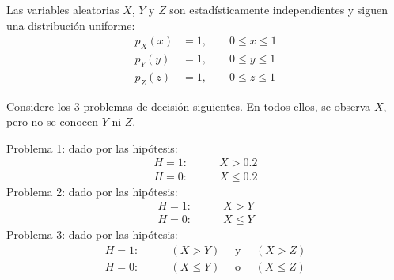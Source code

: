 \question 


\ifspanish


Las variables aleatorias $X$, $Y$ y $Z$ son estadísticamente independientes y siguen una distribución uniforme:
\begin{align*}
p_X(x) &= 1,    \qquad 0 \le x \le 1  \\
p_Y(y) &= 1,    \qquad 0 \le y \le 1  \\
p_Z(z) &= 1,    \qquad 0 \le z \le 1
\end{align*}

Considere los 3 problemas de decisión siguientes. En todos ellos, se observa $X$, pero no se conocen $Y$ ni $Z$.

Problema 1: dado por las hipótesis:
\begin{align*}
H=1: & \qquad  X > 0.2   \\
H=0: & \qquad  X \le 0.2
\end{align*}
Problema 2: dado por las hipótesis:
\begin{align*}
H=1: & \qquad  X > Y   \\
H=0: & \qquad  X \le Y
\end{align*}
Problema 3: dado por las hipótesis:
\begin{align*}
H=1: & \qquad (X > Y)   \quad \text{ y }\quad (X > Z) \\
H=0: & \qquad (X \le Y) \quad \text{ o }\quad (X \le Z)
\end{align*}


